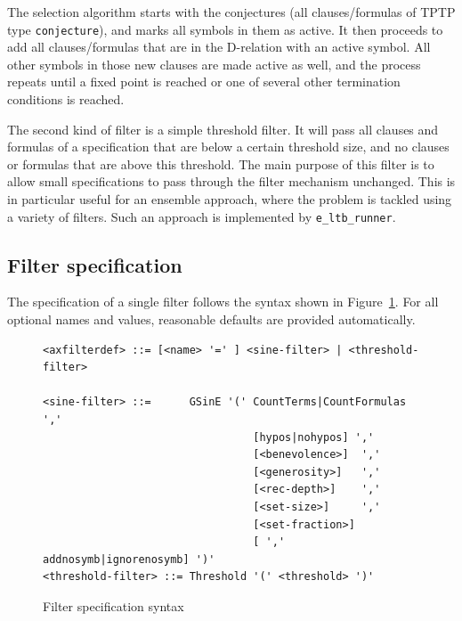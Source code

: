 \documentclass{report}
\begin{document}
The selection algorithm starts with the conjectures (all
clauses/formulas of TPTP type \texttt{conjecture}), and marks all
symbols in them as active. It then proceeds to add all
clauses/formulas that are in the D-relation with an active symbol. All
other symbols in those new clauses are made active as well, and the
process repeats until a fixed point is reached or one of several other
termination conditions is reached.

The second kind of filter is a simple threshold filter. It will pass
all clauses and formulas of a specification that are below a certain
threshold size, and no clauses or formulas that are above this
threshold. The main purpose of this filter is to allow small
specifications to pass through the filter mechanism unchanged. This is
in particular useful for an ensemble approach, where the problem is
tackled using a variety of filters. Such an approach is implemented by
\texttt{e\_ltb\_runner}.


\subsection{Filter specification}

The specification of a single filter follows the syntax shown in
Figure~\ref{fig:axfilter}. For all optional names and values,
reasonable defaults are provided automatically.

\begin{figure}
  \small
\begin{verbatim}
<axfilterdef> ::= [<name> '=' ] <sine-filter> | <threshold-filter>

<sine-filter> ::=      GSinE '(' CountTerms|CountFormulas ','
                                 [hypos|nohypos] ','
                                 [<benevolence>]  ','
                                 [<generosity>]   ','
                                 [<rec-depth>]    ','
                                 [<set-size>]     ','
                                 [<set-fraction>]
                                 [ ',' addnosymb|ignorenosymb] ')'
<threshold-filter> ::= Threshold '(' <threshold> ')'
\end{verbatim}
  \caption{Filter specification syntax}
  \label{fig:axfilter}
\end{figure}
\end{document}
